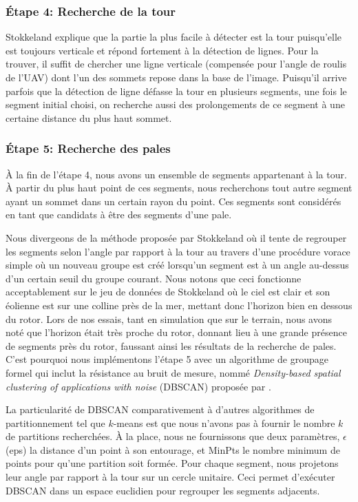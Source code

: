 \subsubsection{Étape 4: Recherche de la tour}
\label{subsubsec:approach4}

Stokkeland explique que la partie la plus facile à détecter est la tour puisqu'elle est toujours verticale et répond fortement à la détection de lignes. Pour la trouver, il suffit de chercher une ligne verticale (compensée pour l'angle de roulis de l'UAV) dont l'un des sommets repose dans la base de l'image. Puisqu'il arrive parfois que la détection de ligne défasse la tour en plusieurs segments, une fois le segment initial choisi, on recherche aussi des prolongements de ce segment à une certaine distance du plus haut sommet.

\subsubsection{Étape 5: Recherche des pales}

À la fin de l'étape 4, nous avons un ensemble de segments appartenant à la tour. À partir du plus haut point de ces segments, nous recherchons tout autre segment ayant un sommet dans un certain rayon du point. Ces segments sont considérés en tant que candidats à être des segments d'une pale.

Nous divergeons de la méthode proposée par Stokkeland où il tente de regrouper les segments selon l'angle par rapport à la tour au travers d'une procédure vorace simple où un nouveau groupe est créé lorsqu'un segment est à un angle au-dessus d'un certain seuil du groupe courant. Nous notons que ceci fonctionne acceptablement sur le jeu de données de Stokkeland où le ciel est clair et son éolienne est sur une colline près de la mer, mettant donc l'horizon bien en dessous du rotor. Lors de nos essais, tant en simulation que sur le terrain, nous avons noté que l'horizon était très proche du rotor, donnant lieu à une grande présence de segments près du rotor, faussant ainsi les résultats de la recherche de pales. C'est pourquoi nous implémentons l'étape 5 avec un algorithme de groupage formel qui inclut la résistance au bruit de mesure, nommé \textit{Density-based spatial clustering of applications with noise} (DBSCAN) proposée par \citep{Ester1996}.

La particularité de DBSCAN comparativement à d'autres algorithmes de partitionnement tel que $k$-means est que nous n'avons pas à fournir le nombre $k$ de partitions recherchées. À la place, nous ne fournissons que deux paramètres, $\epsilon$ (eps) la distance d'un point à son entourage, et MinPts le nombre minimum de points pour qu'une partition soit formée. Pour chaque segment, nous projetons leur angle par rapport à la tour sur un cercle unitaire. Ceci permet d'exécuter DBSCAN dans un espace euclidien pour regrouper les segments adjacents.

